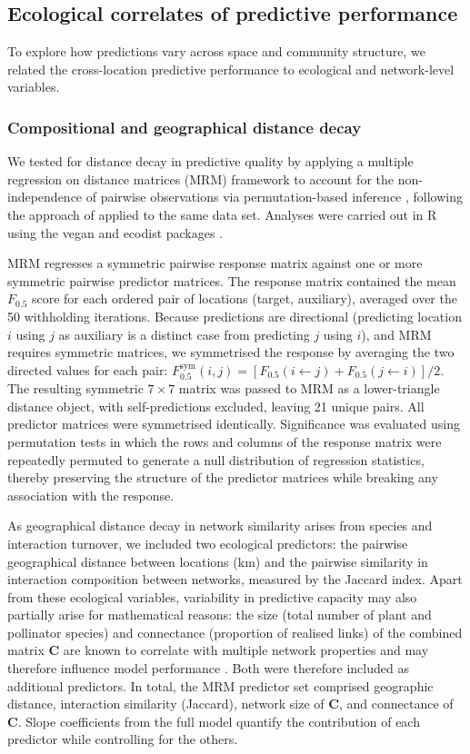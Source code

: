 \documentclass[oneside, a4paper, onecolumn, 11pt]{article}
\newcommand{\revtag}[1]{\textcolor{softcoral}{[#1]}}
\begin{document}
\subsection{Ecological correlates of predictive performance}
To explore how predictions vary across space and community structure, we related the cross-location predictive performance to ecological and network-level variables.

\subsubsection{Compositional and geographical distance decay}
We tested for distance decay in predictive quality by applying a multiple regression on distance matrices (MRM) framework to account for the non-independence of pairwise observations via permutation-based inference \citep{Legendre1994-fd,Lichstein2007-ni}, following the approach of \citet{Vitali2024-gt} applied to the same data set. Analyses were carried out in R using the vegan and ecodist packages \citep{Goslee2007-va,Oksanen2013-az}. %

MRM regresses a symmetric pairwise response matrix against one or more symmetric pairwise predictor matrices. The response matrix contained the mean $F_{0.5}$ score for each ordered pair of locations (target, auxiliary), averaged over the 50 withholding iterations. Because predictions are directional (predicting location $i$ using $j$ as auxiliary is a distinct case from predicting $j$ using $i$), and MRM requires symmetric matrices, we symmetrised the response by averaging the two directed values for each pair: $F_{0.5}^{\mathrm{sym}}(i,j) = [F_{0.5}(i \leftarrow j) + F_{0.5}(j \leftarrow i)] / 2$. The resulting symmetric $7 \times 7$ matrix was passed to MRM as a lower-triangle distance object, with self-predictions excluded, leaving 21 unique pairs. All predictor matrices were symmetrised identically. Significance was evaluated using permutation tests in which the rows and columns of the response matrix were repeatedly permuted to generate a null distribution of regression statistics, thereby preserving the structure of the predictor matrices while breaking any association with the response.

As geographical distance decay in network similarity arises from species and interaction turnover, we included two ecological predictors: the pairwise geographical distance between locations (km) and the pairwise similarity in interaction composition between networks, measured by the Jaccard index. Apart from these ecological variables, variability in predictive capacity may also partially arise for mathematical reasons: the size (total number of plant and pollinator species) and connectance (proportion of realised links) of the combined matrix $\mathbf{C}$ are known to correlate with multiple network properties \citep{Delmas2019-qh} and may therefore influence model performance \citep{Farrell2022-ki}. Both were therefore included as additional predictors. In total, the MRM predictor set comprised geographic distance, interaction similarity (Jaccard), network size of $\mathbf{C}$, and connectance of $\mathbf{C}$. Slope coefficients from the full model quantify the contribution of each predictor while controlling for the others.
\end{document}
